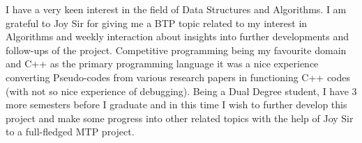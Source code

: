 \begin{titlepage}
\begin{center}
\begin{minipage}{0.9\textwidth}
    \large{
    I have a very keen interest in the field of Data Structures and Algorithms. I am grateful to Joy Sir for giving me a BTP topic related to my interest in Algorithms and weekly interaction about insights into further developments and follow-ups of the project. Competitive programming being my favourite domain and C++ as the primary programming language it was a nice experience converting Pseudo-codes from various research papers in functioning C++ codes (with not so nice experience of debugging). Being a Dual Degree student, I have 3 more semesters before I graduate and in this time I wish to further develop this project and make some progress into other related topics with the help of Joy Sir to a full-fledged MTP project.
    }
    
    \end{minipage}
    \end{center}

    \vfill
\end{titlepage}